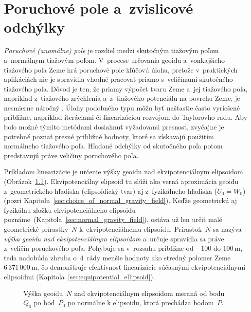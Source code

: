\documentclass[a4paper,12pt]{book}
\begin{document}

\chapter{Poruchové pole a~zvislicové odchýlky}
\label{sec:disturbing_field_deflections}

\emph{Poruchové (anomálne) pole} je rozdiel medzi skutočným tiažovým poľom 
a~normálnym tiažovým poľom.  V~procese určovania geoidu a~vonkajšieho tiažového 
poľa Zeme hrá poruchové pole kľúčovú úlohu, pretože v~praktických aplikáciách 
nie je spravidla vhodné pracovať priamo s~veličinami skutočného tiažového poľa.  
Dôvod je ten, že priamy výpočet tvaru Zeme a~jej tiažového poľa, napríklad 
z~tiažového zrýchlenia a~z~tiažového potenciálu na povrchu Zeme, je nesmierne 
náročný \parencite[pozri 
napríklad][]{Hormander1976,SansoGeodeticBoundaryValueProblem}.  Úlohy podobného 
typu môžu byť našťastie často vyriešené približne, napríklad iteráciami či 
linearizáciou rozvojom do Taylorovho radu.  Aby bolo možné týmito metódami 
dosiahnuť vyžadovanú presnosť, zvyčajne je potrebné poznať presné približné 
hodnoty, ktoré sa získavajú použitím normálneho tiažového poľa.  Hľadané 
odchýlky od skutočného poľa potom predstavujú práve veličiny poruchového poľa.

Príkladom linearizácie je určenie výšky geoidu nad ekvipotenciálnym elipsoidom 
(Obrázok~\ref{fig:geoid}).  Ekvipotenciálny elipsoid tu slúži ako verná 
aproximácia geoidu z~geometrického hľadiska (elipsoidický tvar) aj 
z~fyzikálneho hľadiska ($U_0 = W_0$) (pozri 
Kapitolu~\ref{sec:choice_of_normal_gravity_field}).  Keďže geometrickú aj 
fyzikálnu zložku ekvipotenciálneho elipsoidu 
poznáme~(Kapitola~\ref{sec:normal_gravity_field}), ostáva už len určiť malé 
geometrické prírastky~$N$ k~ekvipotenciálnemu elipsoidu.  Prírastok~$N$ sa 
nazýva \emph{výška geoidu nad ekvipotenciálnym elipsoidom} a~určuje spravidla 
sa práve z~veličín poruchového poľa.  Pohybuje sa v~rozsahu približne od $-100$ 
do $100\ \mathrm{m}$, teda nadobúda zhruba o~4~rády menšie hodnoty ako stredný 
polomer Zeme~$6\, 371 \, 000\ \mathrm{m}$, čo demonštruje efektívnosť 
linearizácie súčasnými ekvipotenciálnymi elipsoidmi 
(Kapitola~\ref{sec:equipotential_ellipsoid}).

\begin{figure}[bt]
\centering

\caption{Výška geoidu~$N$ nad ekvipotenciálnym elipsoidom meraná od bodu~$Q_0$ 
po bod~$P_0$ po normálne k elipsoidu, ktorá prechádza bodom~$P$.}
\label{fig:geoid}
\end{figure}
\end{document}
